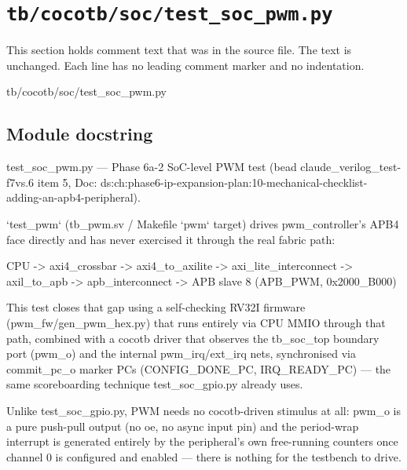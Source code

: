 \section{\texttt{tb/cocotb/soc/test\_soc\_pwm.py}}\label{tm:suite:soc-test-soc-pwm}

This section holds comment text that was in the source file. The text is unchanged. Each line has no leading comment marker and no indentation.

\begin{relocated}{tb/cocotb/soc/test_soc_pwm.py}

\subsection*{Module docstring}

\begin{textblock}
test_soc_pwm.py — Phase 6a-2 SoC-level PWM test (bead claude_verilog_test-f7vs.6
item 5, Doc: ds:ch:phase6-ip-expansion-plan:10-mechanical-checklist-adding-an-apb4-peripheral).

`test_pwm` (tb_pwm.sv / Makefile `pwm` target) drives pwm_controller's APB4 face
directly and has never exercised it through the real fabric path:

CPU -> axi4_crossbar -> axi4_to_axilite -> axi_lite_interconnect ->
axil_to_apb -> apb_interconnect -> APB slave 8 (APB_PWM, 0x2000_B000)

This test closes that gap using a self-checking RV32I firmware
(pwm_fw/gen_pwm_hex.py) that runs entirely via CPU MMIO through that path,
combined with a cocotb driver that observes the tb_soc_top boundary port
(pwm_o) and the internal pwm_irq/ext_irq nets, synchronised via commit_pc_o
marker PCs (CONFIG_DONE_PC, IRQ_READY_PC) — the same scoreboarding technique
test_soc_gpio.py already uses.

Unlike test_soc_gpio.py, PWM needs no cocotb-driven stimulus at all: pwm_o is
a pure push-pull output (no oe, no async input pin) and the period-wrap
interrupt is generated entirely by the peripheral's own free-running counters
once channel 0 is configured and enabled — there is nothing for the
testbench to drive.


\end{textblock}
\end{relocated}
